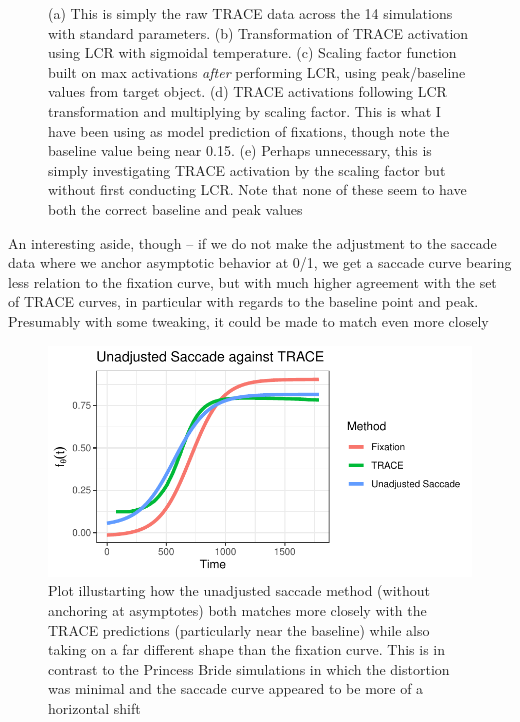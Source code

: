 \documentclass{article}
\begin{document}
\begin{figure}[H]
            \begin{singlespace}
    \caption{(a) This is simply the raw TRACE data across the 14 simulations with standard parameters. (b) Transformation of TRACE activation using LCR with sigmoidal temperature. (c) Scaling factor function built on max activations \textit{after} performing LCR, using peak/baseline values from target object. (d) TRACE activations following LCR transformation and multiplying by scaling factor. This is what I have been using as model prediction of fixations, though note the baseline value being near 0.15. (e) Perhaps unnecessary, this is simply investigating TRACE activation by the scaling factor but without first conducting LCR. Note that none of these seem to have both the correct baseline and peak values} \end{singlespace}
\label{fig:shades_of_trace}
\end{figure}

An interesting aside, though -- if we do not make the adjustment to the saccade data where we anchor asymptotic behavior at 0/1, we get a saccade curve bearing less relation to the fixation curve, but with much higher agreement with the set of TRACE curves, in particular with regards to the baseline point and peak. Presumably with some tweaking, it could be made to match even more closely

\begin{figure}[H]
  \centering
  \includegraphics{unadjusted_sac_w_trace.pdf}
  \caption{Plot illustarting how the unadjusted saccade method (without anchoring at asymptotes) both matches more closely with the TRACE predictions (particularly near the baseline) while also taking on a far different shape than the fixation curve. This is in contrast to the Princess Bride simulations in which the distortion was minimal and the saccade curve appeared to be more of a horizontal shift}
  \label{fig:unadjusted_saccade_against_trace}
\end{figure}
\end{document}
